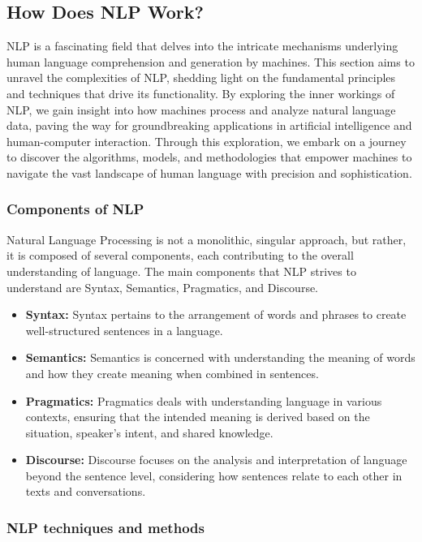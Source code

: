 \subsection{How Does NLP Work?}

NLP is a fascinating field that delves into the intricate mechanisms underlying human language comprehension and generation by machines. This section aims to unravel the complexities of NLP, shedding light on the fundamental principles and techniques that drive its functionality. By exploring the inner workings of NLP, we gain insight into how machines process and analyze natural language data, paving the way for groundbreaking applications in artificial intelligence and human-computer interaction. Through this exploration, we embark on a journey to discover the algorithms, models, and methodologies that empower machines to navigate the vast landscape of human language with precision and sophistication.

\subsubsection*{Components of NLP}

Natural Language Processing is not a monolithic, singular approach, but rather, it is composed of several components, each contributing to the overall understanding of language. The main components that NLP strives to understand are Syntax, Semantics, Pragmatics, and Discourse.

\begin{itemize}
    \item \textbf{Syntax:} Syntax pertains to the arrangement of words and phrases to create well-structured sentences in a language.
    \item \textbf{Semantics:} Semantics is concerned with understanding the meaning of words and how they create meaning when combined in sentences.
    \item \textbf{Pragmatics:} Pragmatics deals with understanding language in various contexts, ensuring that the intended meaning is derived based on the situation, speaker's intent, and shared knowledge.
    \item \textbf{Discourse:} Discourse focuses on the analysis and interpretation of language beyond the sentence level, considering how sentences relate to each other in texts and conversations.
\end{itemize}

\subsubsection*{NLP techniques and methods}

